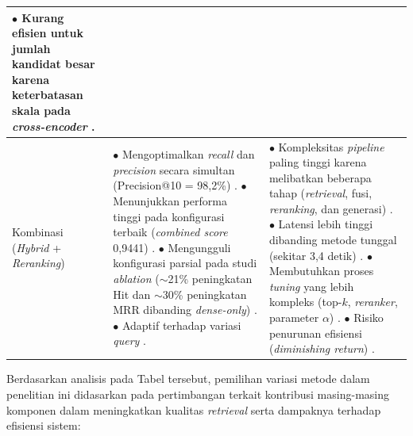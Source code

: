 \begin{table}[H]
\begin{tabular}{|p{2.3cm}|p{5.8cm}|p{5.8cm}|}
$\bullet$ Kurang efisien untuk jumlah kandidat besar karena keterbatasan skala pada \textit{cross-encoder} \cite{gupta2025compliance}. \newline
\\
\hline
Kombinasi (\textit{Hybrid} + \textit{Reranking}) &
$\bullet$ Mengoptimalkan \textit{recall} dan \textit{precision} secara simultan (Precision@10 = 98,2\%) \cite{gupta2025compliance}. \newline
$\bullet$ Menunjukkan performa tinggi pada konfigurasi terbaik (\textit{combined score} 0,9441) \cite{ravishankar2025hybrid}. \newline
$\bullet$ Mengungguli konfigurasi parsial pada studi \textit{ablation} ($\sim$21\% peningkatan Hit dan $\sim$30\% peningkatan MRR dibanding \textit{dense-only}) \cite{liu2025audit}. \newline
$\bullet$ Adaptif terhadap variasi \textit{query} \cite{elkiran2026empirical}. \newline
&
$\bullet$ Kompleksitas \textit{pipeline} paling tinggi karena melibatkan beberapa tahap (\textit{retrieval}, fusi, \textit{reranking}, dan generasi) \cite{ravishankar2025hybrid,elkiran2026empirical}. \newline
$\bullet$ Latensi lebih tinggi dibanding metode tunggal (sekitar 3,4 detik) \cite{gupta2025compliance}. \newline
$\bullet$ Membutuhkan proses \textit{tuning} yang lebih kompleks (top-$k$, \textit{reranker}, parameter $\alpha$) \cite{ravishankar2025hybrid}. \newline
$\bullet$ Risiko penurunan efisiensi (\textit{diminishing return}) \cite{rustamov2025tax,elkiran2026empirical}. \newline
\\
\hline
\end{tabular}
\end{table}

Berdasarkan analisis pada Tabel tersebut, pemilihan variasi metode dalam penelitian ini didasarkan pada pertimbangan terkait kontribusi masing-masing komponen dalam meningkatkan kualitas \textit{retrieval} serta dampaknya terhadap efisiensi sistem:

